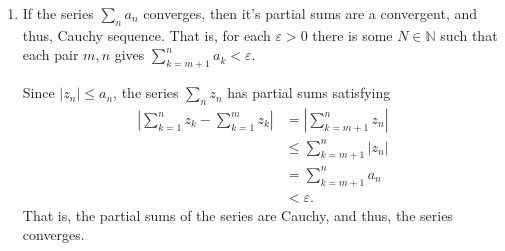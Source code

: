 \documentclass[12 pt, letterpaper]{hmcpset}
\begin{document}
\begin{enumerate}
		Note that for any $\varepsilon > 0$, there is some $N \in \mathbb{N}$ such that for  each pair $m, n > N$ we have $\lvert z_{n} - z_{m} \rvert < \varepsilon$. Equivalently,
		\[
			(x_{n} - x_{m})^{2} + (y_{n} - y_{m})^{2} < \varepsilon^{2}.
		\]
		Thus, for each $\varepsilon > 0$ there exists some $N \in \mathbb{N}$, such that for each pair $m, n > N$ we have both $\lvert x_{n} - x_{m} \rvert < \varepsilon$ and $\lvert y_{n} - y_{m} \rvert < \varepsilon$. That is, both $\{ x_{n} \}_{n \in \mathbb{N}}$ and $\{ y_{n} \}_{n \in \mathbb{N}}$ are Cauchy sequences.

		Any Cauchy sequence of real numbers converges ($\mathbb{R}$ is a complete metric space). Say $x_{n} \to x$ and $y_{n} \to y$ as $n \to \infty$. Then consider $z = x + i y$. For each real $\varepsilon > 0$, there exists some $N \in \mathbb{N}$ such that for all $n > N$, both $\lvert x_{n} - x \rvert$ and $\lvert y_{n} - y \rvert$ are less than $\varepsilon / \sqrt{2}$. Thus, for all $n > N$ we have
		\begin{align*}
			\lvert z_{n} - z \rvert^{2} & = (x_{n} - x)^{2} + (y_{n} - y)^{2} \\
						    & < \varepsilon^{2}/2 + \varepsilon^{2} /2 \\
						    & = \varepsilon^{2}.
		\end{align*}
		Thus, for all $\varepsilon > 0$ there is some $N \in \mathbb{N}$ such that for all $n > N$, we have $\lvert z_{n} - z \rvert < \varepsilon$ --- $z_{n} \to z$  as $n \to \infty$.
	\item If the series $\sum_{n} a_{n}$ converges, then it's partial sums are a convergent, and thus, Cauchy sequence. That is, for each $\varepsilon > 0$ there is some $N \in \mathbb{N}$ such that each pair $m, n$ gives $\sum_{k = m + 1}^{n} a_{k} < \varepsilon$.

		Since $\lvert z_{n} \rvert \le a_{n}$, the series $\sum_{n} z_{n}$ has partial sums satisfying
		\begin{align*}
			\left \lvert \sum_{k = 1}^{n} z_{k} - \sum_{k = 1}^{m} z_{k} \right \rvert & = \left \lvert \sum_{k = m + 1}^{n} z_{n} \right \rvert \\ 
												   & \le \sum_{k = m + 1}^{n} \lvert z_{n} \rvert \\
												   & = \sum_{k = m + 1}^{n} a_{n} \\
												   & < \varepsilon.
		\end{align*}
		That is, the partial sums of the series are Cauchy, and thus, the series converges.
\end{enumerate}
\end{document}

